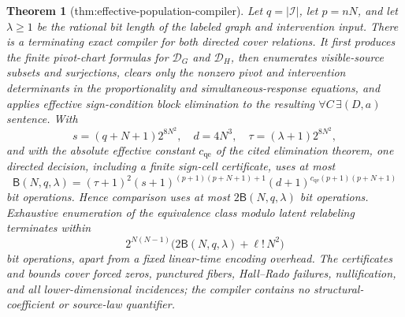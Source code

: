 \documentclass{article}
\newtheorem{theorem}{Theorem}
\begin{document}
\begin{theorem}[thm:effective-population-compiler]\label{thm:effective-population-compiler}
Let \(q=|\mathcal I|\), let \(p=nN\), and let \(\lambda\geq1\) be the rational bit length of the labeled graph and intervention input.  There is a terminating exact compiler for both directed cover relations.  It first produces the finite pivot-chart formulas for \(\mathcal D_G\) and \(\mathcal D_H\), then enumerates visible-source subsets and surjections, clears only the nonzero pivot and intervention determinants in the proportionality and simultaneous-response equations, and applies effective sign-condition block elimination to the resulting \(\forall C\,\exists(D,a)\) sentence.  With
\[
s=(q+N+1)2^{8N^2},\quad d=4N^3,\quad \tau=(\lambda+1)2^{8N^2},
\]
and with the absolute effective constant \(c_{\mathrm{qe}}\) of the cited elimination theorem, one directed decision, including a finite sign-cell certificate, uses at most
\[
\mathsf B(N,q,\lambda)
=(\tau+1)^2(s+1)^{(p+1)(p+N+1)+1}
(d+1)^{c_{\mathrm{qe}}(p+1)(p+N+1)}                                   \tag{16}
\]
bit operations.  Hence comparison uses at most \(2\mathsf B(N,q,\lambda)\) bit operations.  Exhaustive enumeration of the equivalence class modulo latent relabeling terminates within
\[
2^{N(N-1)}\bigl(2\mathsf B(N,q,\lambda)+\ell!\,N^2\bigr)               \tag{17}
\]
bit operations, apart from a fixed linear-time encoding overhead.  The certificates and bounds cover forced zeros, punctured fibers, Hall--Rado failures, nullification, and all lower-dimensional incidences; the compiler contains no structural-coefficient or source-law quantifier.
\end{theorem}
\end{document}
